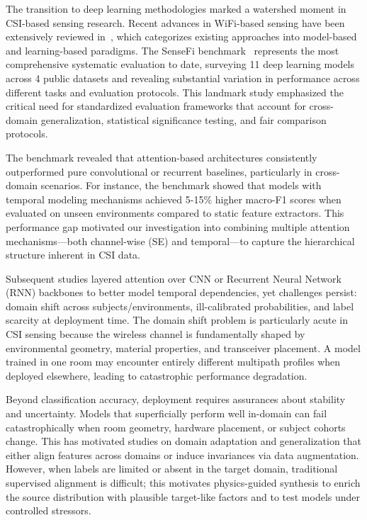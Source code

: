 \documentclass[lettersize,journal]{IEEEtran}
\begin{document}
The transition to deep learning methodologies marked a watershed moment in CSI-based sensing research. Recent advances in WiFi-based sensing have been extensively reviewed in~\cite{liu2024wifi}, which categorizes existing approaches into model-based and learning-based paradigms. The SenseFi benchmark~\cite{yang2023sensefi} represents the most comprehensive systematic evaluation to date, surveying 11 deep learning models across 4 public datasets and revealing substantial variation in performance across different tasks and evaluation protocols. This landmark study emphasized the critical need for standardized evaluation frameworks that account for cross-domain generalization, statistical significance testing, and fair comparison protocols.

The benchmark revealed that attention-based architectures consistently outperformed pure convolutional or recurrent baselines, particularly in cross-domain scenarios. For instance, the benchmark showed that models with temporal modeling mechanisms achieved 5-15\% higher macro-F1 scores when evaluated on unseen environments compared to static feature extractors. This performance gap motivated our investigation into combining multiple attention mechanisms—both channel-wise (SE) and temporal—to capture the hierarchical structure inherent in CSI data.

Subsequent studies layered attention over CNN or Recurrent Neural Network (RNN) backbones to better model temporal dependencies, yet challenges persist: domain shift across subjects/environments, ill-calibrated probabilities, and label scarcity at deployment time. The domain shift problem is particularly acute in CSI sensing because the wireless channel is fundamentally shaped by environmental geometry, material properties, and transceiver placement. A model trained in one room may encounter entirely different multipath profiles when deployed elsewhere, leading to catastrophic performance degradation.

Beyond classification accuracy, deployment requires assurances about stability and uncertainty. Models that superficially perform well in-domain can fail catastrophically when room geometry, hardware placement, or subject cohorts change. This has motivated studies on domain adaptation and generalization that either align features across domains or induce invariances via data augmentation. However, when labels are limited or absent in the target domain, traditional supervised alignment is difficult; this motivates physics-guided synthesis to enrich the source distribution with plausible target-like factors and to test models under controlled stressors.
\end{document}
